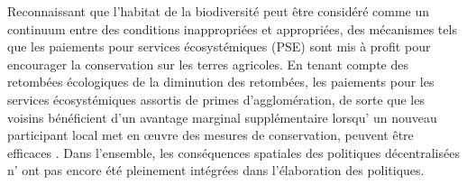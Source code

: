 Reconnaissant que l'habitat de la biodiversité peut être considéré comme un continuum entre des conditions inappropriées et appropriées, des mécanismes tels que les paiements pour services écosystémiques (PSE) sont mis à profit pour encourager la conservation sur les terres agricoles. En tenant compte des retombées écologiques de la diminution des retombées, les paiements pour les services écosystémiques assortis de primes d'agglomération, de sorte que les voisins bénéficient d'un avantage marginal supplémentaire lorsqu' un nouveau participant local met en œuvre des mesures de conservation, peuvent être efficaces \citep{parkhurst2002agglomeration, bareille_agglomeration_2023}. Dans l'ensemble, les conséquences spatiales des politiques décentralisées n' ont pas encore été pleinement intégrées dans l'élaboration des politiques.

